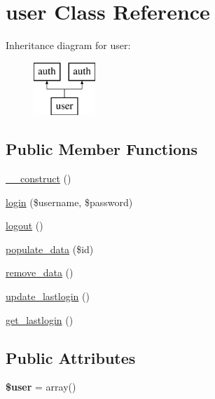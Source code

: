 \hypertarget{classuser}{\section{user Class Reference}
\label{classuser}
}
Inheritance diagram for user\-:\begin{figure}[H]
\begin{center}
\leavevmode
\includegraphics[height=2.000000cm]{classuser}
\end{center}
\end{figure}
\subsection*{Public Member Functions}
\begin{DoxyCompactItemize}
\item 
\hyperlink{classuser_acf59e1e14564ce949759964415069581}{\-\_\-\-\_\-construct} ()
\item 
\hyperlink{classuser_a0846994f392a18a32bfcae200cb33974}{login} (\$username, \$password)
\item 
\hyperlink{classuser_acb8e72f7d45579e3f07e071e06d11ac8}{logout} ()
\item 
\hyperlink{classuser_aad321ca58463f653b456dae243737c7e}{populate\-\_\-data} (\$id)
\item 
\hyperlink{classuser_a309159734946cdb67542dc0110055ae0}{remove\-\_\-data} ()
\item 
\hyperlink{classuser_a9538d09a879e3d85c9cedcc634df5751}{update\-\_\-lastlogin} ()
\item 
\hyperlink{classuser_a317fcb7a9feaf538c182b28fb7c9844c}{get\-\_\-lastlogin} ()
\end{DoxyCompactItemize}
\subsection*{Public Attributes}
\begin{DoxyCompactItemize}
\item 
\hypertarget{classuser_a60824fccae7197959b184fb04a6de2b9}{{\bfseries \$user} = array()}\label{classuser_a60824fccae7197959b184fb04a6de2b9}

\end{DoxyCompactItemize}


